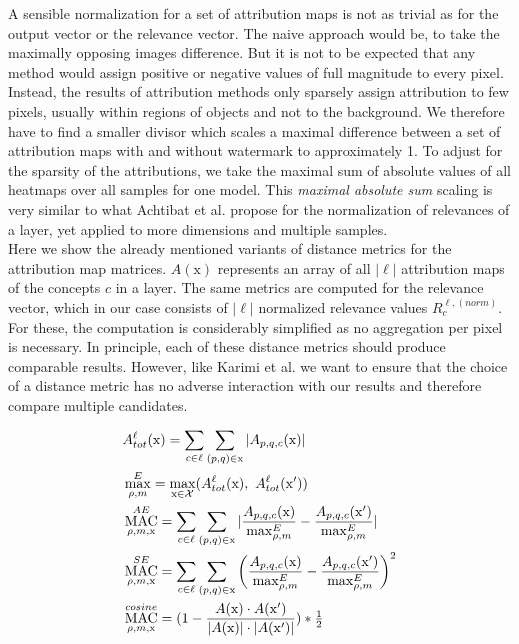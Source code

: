 A sensible normalization for a set of attribution maps is not as trivial as for the output vector or the relevance vector. The naive approach would be, to take the maximally opposing images difference. But it is not to be expected that any method would assign positive or negative values of full magnitude to every pixel. Instead, the results of attribution methods only sparsely assign attribution to few pixels, usually within regions of objects and not to the background. 
We therefore have to find a smaller divisor which scales a maximal difference between a set of attribution maps with and without watermark to approximately 1.
To adjust for the sparsity of the attributions, we take the maximal sum of absolute values of all heatmaps over all samples for one model. This \textit{maximal absolute sum} scaling is very similar to what Achtibat et al. \cite{Achtibat2022} propose for the normalization of relevances of a layer, yet applied to more dimensions and multiple samples.\\

Here we show the already mentioned variants of distance metrics for the attribution map matrices. $A(\mathrm{x})$ represents an array of all $|\ell|$ attribution maps of the concepts $c$ in a layer. The same metrics are computed for the relevance vector, which in our case consists of $|\ell|$ normalized relevance values $R_{c}^{\ell,(norm)}$. For these, the computation is considerably simplified as no aggregation per pixel is necessary. In principle, each of these distance metrics should produce comparable results. However, like Karimi et al. \cite{Karimi2023} we want to ensure that the choice of a distance metric has no adverse interaction with our results and therefore compare multiple candidates.

\begin{align}
\displaystyle 
& A_{tot}^{\ell}(\mathrm{x}) = \sum_{c \in \ell} \sum_{(p,q) \in \mathrm{x}} |A_{p,q,c}(\mathrm{x})|  \label{eq:total_absolute_relevance}  \\
& \max_{\rho, m}^E = \max_{\mathrm{x} \in \mathcal{X}} (A_{tot}^{\ell}(\mathrm{x}) , \  A_{tot}^{\ell}(\mathrm{x'}) )\\
& \operatorname*{MAC}_{\rho, m, \mathrm{x}}^{AE} = 
\sum_{c \in \ell} \sum_{(p,q) \in \mathrm{x}}| \frac{A_{p,q,c}(\mathrm{x})}{\max_{\rho, m}^E} -\frac{A_{p,q,c}(\mathrm{x'})}{\max_{\rho, m}^E}|\\
& \operatorname*{MAC}_{\rho, m, \mathrm{x}}^{SE} = 
\sum_{c \in \ell} \sum_{(p,q) \in \mathrm{x}} \left( \frac{A_{p,q,c}(\mathrm{x})}{\max_{\rho, m}^E} -\frac{A_{p,q,c}(\mathrm{x'})}{\max_{\rho, m}^E}\right) ^2  \\
& \operatorname*{MAC}_{\rho, m,\mathrm{x}}^{cosine} = (1- 
\frac{A(\mathrm{x}) \cdot A(\mathrm{x'}) }{|A(\mathrm{x})|\cdot |A(\mathrm{x'})|}) * \tfrac{1}{2}
\end{align}

